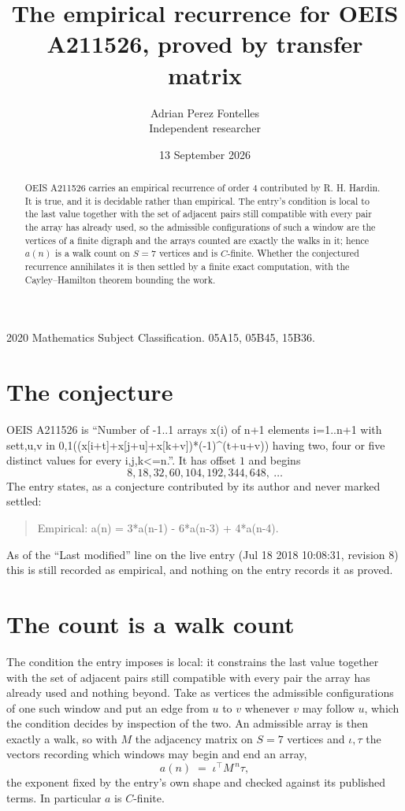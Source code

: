 \documentclass[11pt,a4paper]{article}
\title{The empirical recurrence for OEIS A211526, proved by transfer matrix}
\author{Adrian Perez Fontelles\\ \small Independent researcher}
\date{13 September 2026}
\theoremstyle{plain}
\theoremstyle{definition}
\begin{document}
\maketitle

\begin{abstract}
OEIS A211526 carries an empirical recurrence of order $4$ contributed by R. H. Hardin. It is
true, and it is decidable rather than empirical. The entry's condition is local to the last value together with the set of adjacent pairs still compatible with every pair the array has already used, so
the admissible configurations of such a window are the vertices of a finite digraph and the
arrays counted are exactly the walks in it; hence $a(n)$ is a walk count on $S=7$ vertices
and is $C$-finite. Whether the conjectured recurrence annihilates it is then settled by a
finite exact computation, with the Cayley--Hamilton theorem bounding the work.
\end{abstract}

\noindent\small 2020 Mathematics Subject Classification. 05A15, 05B45, 15B36.\normalsize

\section{The conjecture}

OEIS A211526 is ``Number of -1..1 arrays x(i) of n+1 elements i=1..n+1 with set{t,u,v in 0,1}((x[i+t]+x[j+u]+x[k+v])*(-1)\^{}(t+u+v)) having two, four or five distinct values for every i,j,k<=n.''. It has offset $1$ and begins
\[
8, 18, 32, 60, 104, 192, 344, 648,\ \dots
\]
The entry states, as a conjecture contributed by its author and never marked settled:
\begin{quote}
Empirical: a(n) = 3*a(n-1) - 6*a(n-3) + 4*a(n-4).
\end{quote}
As of the ``Last modified'' line on the live entry (Jul 18 2018 10:08:31, revision 8) this is still
recorded as empirical, and nothing on the entry records it as proved.

\section{The count is a walk count}

The condition the entry imposes is local: it constrains the last value together with the set of adjacent pairs still compatible with every pair the array has already used and nothing beyond. Take as
vertices the admissible configurations of one such window and put an edge from $u$ to $v$
whenever $v$ may follow $u$, which the condition decides by inspection of the two. An
admissible array is then exactly a walk, so with $M$ the adjacency matrix on $S=7$ vertices
and $\iota,\tau$ the vectors recording which windows may begin and end an array,
\[
a(n)\;=\;\iota^{\!\top}M^{\,n}\tau ,
\]
the exponent fixed by the entry's own shape and checked against its published terms. In
particular $a$ is $C$-finite.
\end{document}
